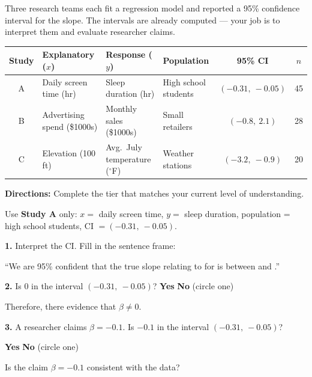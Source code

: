 \documentclass[10pt]{article}
\begin{document}
\namepartnerperiod

\vspace{0.1in}
Three research teams each fit a regression model and reported a 95\% confidence interval
for the slope. The intervals are already computed --- your job is to interpret them and
evaluate researcher claims.

\vspace{0.08in}
\begin{center}
\renewcommand{\arraystretch}{1.4}
\begin{tabular}{clllcc}
    \textbf{Study} & \textbf{Explanatory ($x$)} & \textbf{Response ($y$)} &
    \textbf{Population} & \textbf{95\% CI} & \textbf{$n$} \\
    \hline
    A & Daily screen time (hr) & Sleep duration (hr) & High school students & $(-0.31,\ -0.05)$ & 45 \\
    B & Advertising spend (\$1000s) & Monthly sales (\$1000s) & Small retailers & $(-0.8,\ 2.1)$ & 28 \\
    C & Elevation (100 ft) & Avg.\ July temperature ($^\circ$F) & Weather stations & $(-3.2,\ -0.9)$ & 20 \\
\end{tabular}
\end{center}

\vspace{0.1in}
\textbf{Directions:} Complete the tier that matches your current level of understanding.

\begin{tcolorbox}[colback=white, colframe=black!40,
    title=\textbf{Tier R --- Remediate},
    fonttitle=\bfseries, arc=2mm, left=3mm, right=3mm, top=2mm, bottom=2mm]

Use \textbf{Study A} only: $x =$ daily screen time, $y =$ sleep duration,
population = high school students, CI $= (-0.31,\ -0.05)$.

\textbf{1.} Interpret the CI. Fill in the sentence frame:

\vspace{0.05in}
``We are 95\% confident that the true slope relating \blank{4.5cm} to \blank{4.5cm}
for \blank{4cm} is between \blank{2cm} and \blank{2cm} \blank{3cm}.''

\vspace{0.1in}
\textbf{2.} Is 0 in the interval $(-0.31,\ -0.05)$? \quad \textbf{Yes} \quad \textbf{No}
\quad (circle one)

\vspace{0.05in}
Therefore, there \blank{2cm} evidence that $\beta \ne 0$.

\vspace{0.1in}
\textbf{3.} A researcher claims $\beta = -0.1$. Is $-0.1$ in the interval $(-0.31,\ -0.05)$?

\quad \textbf{Yes} \quad \textbf{No} \quad (circle one)

\vspace{0.05in}
Is the claim $\beta = -0.1$ consistent with the data? \blank{5cm}

\end{tcolorbox}
\end{document}
